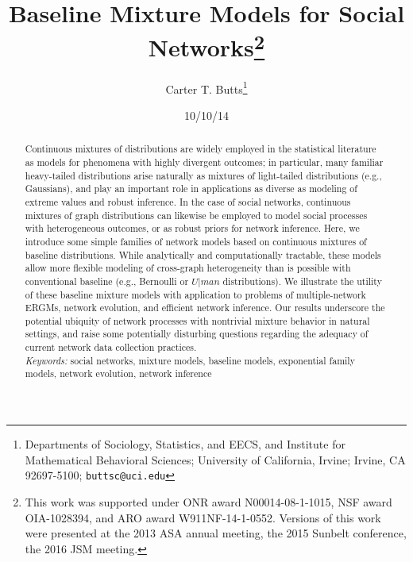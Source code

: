 \documentclass[11pt]{article}
\begin{document}
\title{Baseline Mixture Models for Social Networks\thanks{This work was supported under ONR award N00014-08-1-1015, NSF award OIA-1028394, and ARO award W911NF-14-1-0552.  Versions of this work were presented at the 2013 ASA annual meeting, the 2015 Sunbelt conference, the 2016 JSM meeting.}
}

\author{
Carter T. Butts\thanks{Departments of Sociology, Statistics, and EECS, and Institute for Mathematical Behavioral Sciences; University of California, Irvine; Irvine, CA 92697-5100; \texttt{buttsc@uci.edu}}
}
\date{10/10/14}
\maketitle

\begin{abstract}
Continuous mixtures of distributions are widely employed in the statistical literature as models for phenomena with highly divergent outcomes; in particular, many familiar heavy-tailed distributions arise naturally as mixtures of light-tailed distributions (e.g., Gaussians), and play an important role in applications as diverse as modeling of extreme values and robust inference.  In the case of social networks, continuous mixtures of graph distributions can likewise be employed to model social processes with heterogeneous outcomes, or as robust priors for network inference.  Here, we introduce some simple families of network models based on continuous mixtures of baseline distributions.  While analytically and computationally tractable, these models allow more flexible modeling of cross-graph heterogeneity than is possible with conventional baseline (e.g., Bernoulli or $U|man$ distributions).  We illustrate the utility of these baseline mixture models with application to problems of multiple-network ERGMs, network evolution, and efficient network inference.  Our results underscore the potential ubiquity of network processes with nontrivial mixture behavior in natural settings, and raise some potentially disturbing questions regarding the adequacy of current network data collection practices.\\[5pt]
\emph{Keywords:} social networks, mixture models, baseline models, exponential family models, network evolution, network inference
\end{abstract}

\theoremstyle{plain}                        %
\newtheorem{axiom}{Axiom}
\newtheorem{lemma}{Lemma}
\newtheorem{theorem}{Theorem}
\newtheorem{corollary}{Corollary}
\end{document}

